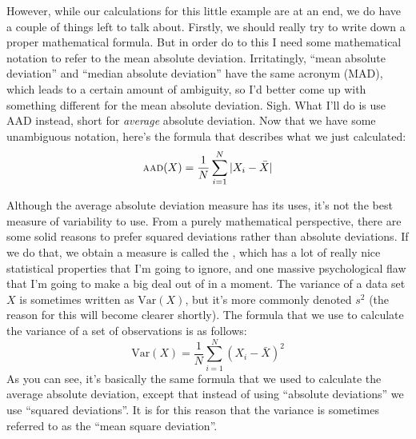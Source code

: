 However, while our calculations for this little example are at an end, we do have a couple of things left to talk about. Firstly, we should really try to write down a proper mathematical formula. But in order do to this I need some mathematical notation to refer to the mean absolute deviation. Irritatingly, ``mean absolute deviation'' and ``median absolute deviation'' have the same acronym (MAD), which leads to a certain amount of ambiguity, so I'd better come up with something different for the mean absolute deviation. Sigh. What I'll do is use AAD instead, short for {\it average} absolute deviation. Now that we have some unambiguous notation, here's the formula that describes what we just calculated:
$$
\mbox{\textsc{aad}}(X) = \frac{1}{N} \sum_{i = 1}^N |X_i - \bar{X}|
$$



Although the average absolute deviation measure has its uses, it's not the best measure of variability to use. From a purely mathematical perspective, there are some solid reasons to prefer squared deviations rather than absolute deviations. If we do that, we obtain a measure is called the , which has a lot of really nice statistical properties that I'm going to ignore, and one massive psychological flaw that I'm going to make a big deal out of in a moment. The variance of a data set $X$ is sometimes written as $\mbox{Var}(X)$, but it's more commonly denoted $s^2$ (the reason for this will become clearer shortly). The formula that we use to calculate the variance of a set of observations is as follows:
$$
\mbox{Var}(X) = \frac{1}{N} \sum_{i=1}^N \left( X_i - \bar{X} \right)^2
$$
As you can see, it's basically the same formula that we used to calculate the average absolute deviation, except that instead of using ``absolute deviations'' we use ``squared deviations''. It is for this reason that the variance is sometimes referred to as the ``mean square deviation''.

